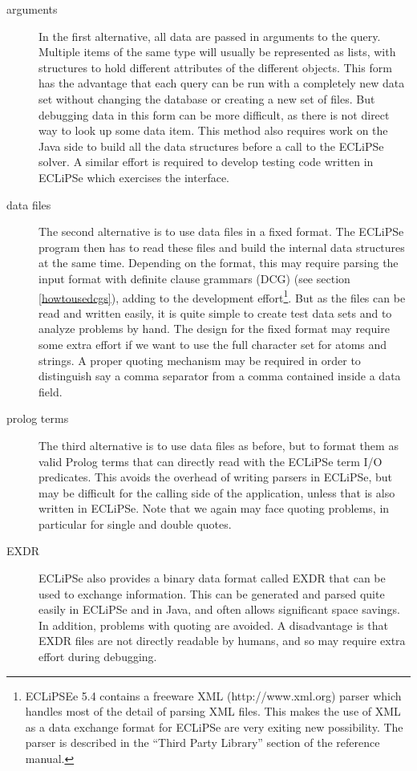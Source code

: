 \documentclass[a4paper,12pt]{report}
\begin{document}
\begin{description}
\item[arguments] In the first alternative, all data are passed in arguments to the query. Multiple items of the same type will usually be represented as lists, with structures to hold different attributes of the different objects. This form has the advantage that each query can be run with a completely new data set without changing the database or creating a new set of files. But debugging data in this form can be more difficult, as there is not direct way to look up some data item. This method also requires work on the Java side to build all the data structures before a call to the ECLiPSe solver. A similar effort is required to develop testing code written in ECLiPSe which exercises the interface.

\item[data files] The second alternative is to use data files in a fixed format. The ECLiPSe program then has to read these files and build the internal data structures at the same time. Depending on the format, this may require parsing the input format with definite clause grammars (DCG) (see section \ref{howtousedcgs}), adding to the development effort\footnote{ECLiPSEe 5.4 contains a freeware XML (http://www.xml.org) parser which handles most of the detail of parsing XML files. This makes the use of XML as a data exchange format for ECLiPSe are very exiting new possibility. The parser is described in the ``Third Party Library'' section of the reference manual.}. But as the files can be read and written easily, it is quite simple to create test data sets and to analyze problems by hand. The design for the fixed format may require some extra effort if we want to use the full character set for atoms and strings. A proper quoting mechanism may be required in order to distinguish say a comma separator from a comma contained inside a data field.

\item[prolog terms] The third alternative is to use data files as before, but to format them as valid Prolog terms that can directly read with the ECLiPSe term I/O predicates. This avoids the overhead of writing parsers in ECLiPSe, but may be difficult for the calling side of the application, unless that is also written in ECLiPSe. Note that we again may face quoting problems, in particular for single and double quotes.

\item[EXDR] ECLiPSe also provides a binary data format called EXDR that can be used to exchange information. This can be generated and parsed quite easily in ECLiPSe and in Java, and often allows significant space savings. In addition, problems with quoting are avoided. A disadvantage is that EXDR files are not directly readable by humans, and so may require extra effort during debugging. 


\end{description}
\end{document}
